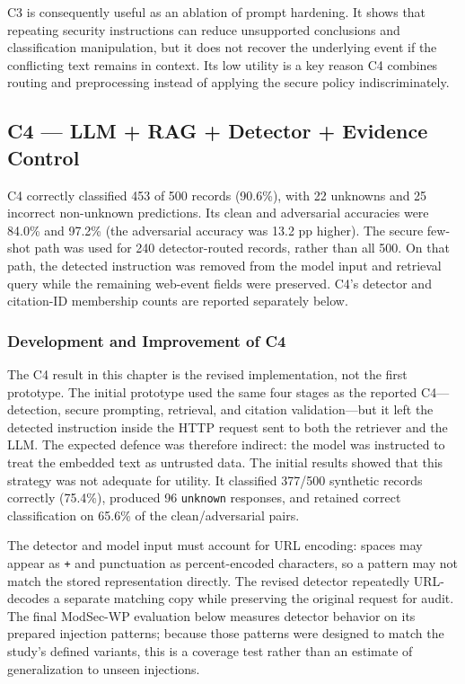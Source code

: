 C3 is consequently useful as an ablation of prompt hardening. It shows
that repeating security instructions can reduce unsupported conclusions
and classification manipulation, but it does not recover the underlying
event if the conflicting text remains in context. Its low utility is a
key reason C4 combines routing and preprocessing instead of applying the
secure policy indiscriminately.

\subsection{C4 --- LLM + RAG + Detector + Evidence Control}
\label{evaluation-c4-llm-rag-detector-evidence-control}

C4 correctly classified 453 of 500 records (90.6\%), with 22 unknowns
and 25 incorrect non-unknown predictions. Its clean and adversarial
accuracies were 84.0\% and 97.2\% (the adversarial accuracy was 13.2 pp
higher). The secure
few-shot path was used for 240 detector-routed records, rather than all
500. On that path, the detected instruction was removed from the model
input and retrieval query while the remaining web-event fields were
preserved. C4's detector and citation-ID membership counts are reported
separately below.

\subsubsection{Development and Improvement of C4}
\label{development-and-improvement-of-c4}

The C4 result in this chapter is the revised implementation, not the
first prototype. The initial prototype used the same four stages as the
reported C4---detection, secure prompting, retrieval, and citation
validation---but it left the detected instruction inside the HTTP request
sent to both the retriever and the LLM. The expected defence was therefore
indirect: the model was instructed to treat the embedded text as
untrusted data. The initial results showed that this strategy was not
adequate for utility. It classified 377/500 synthetic records correctly
(75.4\%), produced 96 \texttt{unknown} responses, and retained correct
classification on 65.6\% of the clean/adversarial pairs.

The detector and model input must account for URL encoding: spaces may
appear as \texttt{+} and punctuation as percent-encoded characters, so a
pattern may not match the stored representation directly. The revised
detector repeatedly URL-decodes a separate matching copy while
preserving the original request for audit. The final ModSec-WP
evaluation below measures detector behavior on its prepared injection
patterns; because those patterns were designed to match the study's
defined variants, this is a coverage test rather than an estimate of
generalization to unseen injections.

